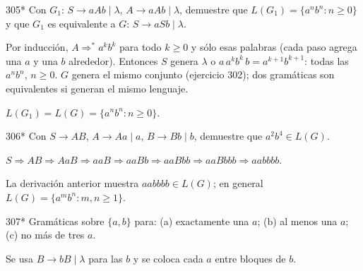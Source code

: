 \documentclass[11pt]{article}
\begin{document}
\begin{ejercicio}{305}{*}
Con $G_1$: $S \to aAb \mid \lambda$, $A \to aAb \mid \lambda$, demuestre que $L(G_1) = \{a^nb^n : n \ge 0\}$ y que $G_1$ es equivalente a $G$: $S \to aSb \mid \lambda$.
\end{ejercicio}
\proc Por inducción, $A \Rightarrow^* a^kb^k$ para todo $k \ge 0$ y sólo esas palabras (cada paso agrega una $a$ y una $b$ alrededor). Entonces $S$ genera $\lambda$ o $a\,a^kb^k\,b = a^{k+1}b^{k+1}$: todas las $a^nb^n$, $n \ge 0$. $G$ genera el mismo conjunto (ejercicio 302); dos gramáticas son equivalentes si generan el mismo lenguaje.

\resp $L(G_1) = L(G) = \{a^nb^n : n \ge 0\}$.


\begin{ejercicio}{306}{*}
Con $S \to AB$, $A \to Aa \mid a$, $B \to Bb \mid b$, demuestre que $a^2b^4 \in L(G)$.
\end{ejercicio}
\proc $S \Rightarrow AB \Rightarrow AaB \Rightarrow aaB \Rightarrow aaBb \Rightarrow aaBbb \Rightarrow aaBbbb \Rightarrow aabbbb$.

\resp La derivación anterior muestra $aabbbb \in L(G)$; en general $L(G) = \{a^mb^n : m, n \ge 1\}$.


\begin{ejercicio}{307}{*}
Gramáticas sobre $\{a, b\}$ para: (a) exactamente una $a$; (b) al menos una $a$; (c) no más de tres $a$.
\end{ejercicio}
\proc Se usa $B \to bB \mid \lambda$ para las $b$ y se coloca cada $a$ entre bloques de $b$.
\end{document}
